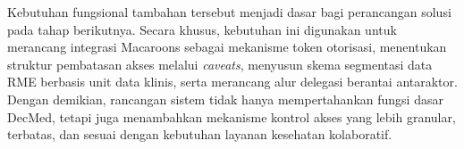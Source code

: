 Kebutuhan fungsional tambahan tersebut menjadi dasar bagi perancangan solusi pada tahap berikutnya. Secara khusus, kebutuhan ini digunakan untuk merancang integrasi Macaroons sebagai mekanisme token otorisasi, menentukan struktur pembatasan akses melalui \textit{caveats}, menyusun skema segmentasi data RME berbasis unit data klinis, serta merancang alur delegasi berantai antaraktor. Dengan demikian, rancangan sistem tidak hanya mempertahankan fungsi dasar DecMed, tetapi juga menambahkan mekanisme kontrol akses yang lebih granular, terbatas, dan sesuai dengan kebutuhan layanan kesehatan kolaboratif.
